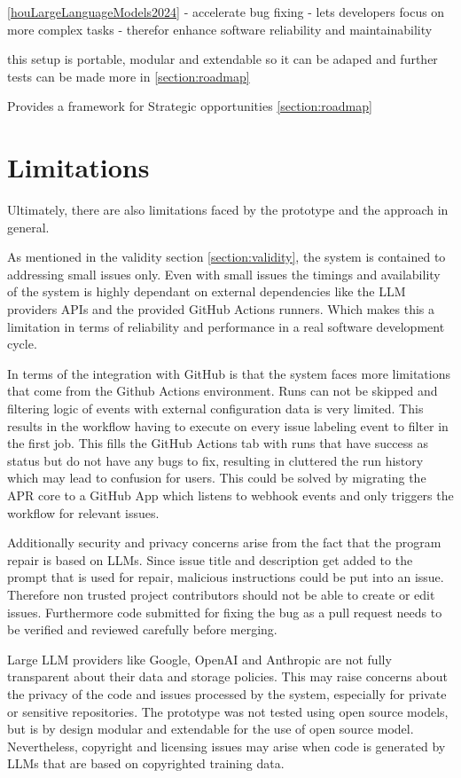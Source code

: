 \ref{houLargeLanguageModels2024}
- accelerate bug fixing
- lets developers focus on more complex tasks
- therefor enhance software reliability and maintainability


this setup is portable, modular and extendable so it can be adaped and further tests can be made more in \ref{section:roadmap}


Provides a framework for Strategic opportunities \ref{section:roadmap}

\section{Limitations}
Ultimately, there are also limitations faced by the prototype and the approach in general.

As mentioned in the validity section \ref{section:validity}, the system is contained to addressing small issues only. Even with small issues the timings and availability of the system is highly dependant on external dependencies like the LLM providers APIs and the provided GitHub Actions runners. Which makes this a limitation in terms of reliability and performance in a real software development cycle.

In terms of the integration with GitHub is that the system faces more limitations that come from the Github Actions environment. Runs can not be skipped and filtering logic of events with external configuration data is very limited. This results in the workflow having to execute on every issue labeling event to filter in the first job. This fills the GitHub Actions tab with runs that have success as status but do not have any bugs to fix, resulting in cluttered the run history which may lead to confusion for users. This could be solved by migrating the APR core to a GitHub App which listens to webhook events and only triggers the workflow for relevant issues.

Additionally security and privacy concerns arise from the fact that the program repair is based on LLMs. Since issue title and description get added to the prompt that is used for repair, malicious instructions could be put into an issue. Therefore non trusted project contributors should not be able to create or edit issues. Furthermore code submitted for fixing the bug as a pull request needs to be verified and reviewed carefully before merging.

Large LLM providers like Google, OpenAI and Anthropic are not fully transparent about their data and storage policies. This may raise concerns about the privacy of the code and issues processed by the system, especially for private or sensitive repositories. The prototype was not tested using open source models, but is by design modular and  extendable for the use of open source model. Nevertheless, copyright and licensing issues may arise when code is generated by LLMs that are based on copyrighted training data. \cite{sauvolaFutureSoftwareDevelopment2024, houLargeLanguageModels2024}


